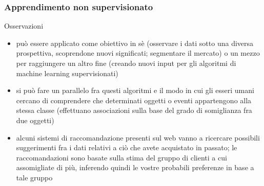 \begin{frame}
	\frametitle{Apprendimento non supervisionato}
	\begin{block}{Osservazioni}
		\begin{itemize}
			\item può essere applicato come obiettivo in sè (osservare i dati sotto una diversa prospettiva, scoprendone nuovi significati; segmentare il mercato) o un mezzo per raggiungere un altro fine (creando nuovi input per gli algoritmi di machine learning supervisionati)
			\item si può fare un parallelo fra questi algoritmi e il modo in cui gli esseri umani cercano di comprendere che determinati oggetti o eventi appartengono alla stessa classe (effettuano associazioni sulla base del grado di somiglianza fra due oggetti)
			\item alcuni sistemi di raccomandazione presenti sul web vanno a ricercare possibili suggerimenti fra i dati relativi a ciò che avete acquistato in passato; le raccomandazioni sono basate sulla stima del gruppo di clienti a cui assomigliate di più, inferendo quindi le vostre probabili preferenze in base a tale gruppo
		\end{itemize}

	\end{block}

\end{frame}


